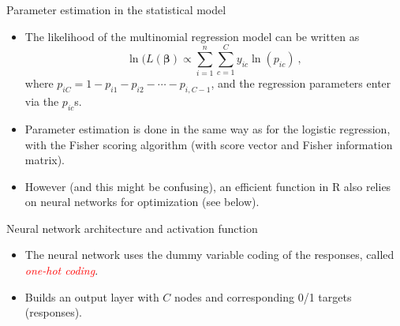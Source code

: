 \documentclass[10pt,ignorenonframetext,]{beamer}
\begin{document}
\begin{frame}

\begin{block}{Parameter estimation in the statistical model}

\vspace{2mm}

\begin{itemize}
\item
  The likelihood of the multinomial regression model can be written as
  \[ \ln(L({\boldsymbol \beta})\propto \sum_{i=1}^n \sum_{c=1}^C y_{ic}\ln(p_{ic}) \ ,\]
  where \(p_{iC}=1-p_{i1}-p_{i2}-\cdots -p_{i,C-1}\), and the regression
  parameters enter via the \(p_{ic}\)s.
\item
  Parameter estimation is done in the same way as for the logistic
  regression, with the Fisher scoring algorithm (with score vector and
  Fisher information matrix).
\item
  However (and this might be confusing), an efficient function in R also
  relies on neural networks for optimization (see below).
\end{itemize}

\end{block}

\end{frame}

\begin{frame}

\begin{block}{Neural network architecture and activation function}

\vspace{4mm}

\begin{itemize}
\item
  The neural network uses the dummy variable coding of the responses,
  called \emph{\textcolor{red}{one-hot coding}}.
\item
  Builds an output layer with \(C\) nodes and corresponding 0/1 targets
  (responses).
\end{itemize}

\end{block}

\end{frame}
\end{document}
